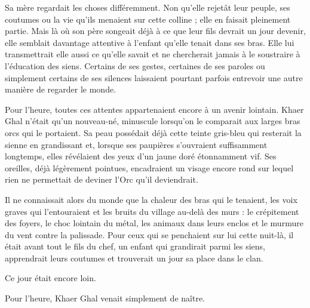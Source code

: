 Sa mère regardait les choses différemment. Non qu'elle rejetât leur peuple, ses
coutumes ou la vie qu'ils menaient sur cette colline ; elle en faisait
pleinement partie. Mais là où son père songeait déjà à ce que leur fils devrait
un jour devenir, elle semblait davantage attentive à l'enfant qu'elle tenait
dans ses bras. Elle lui transmettrait elle aussi ce qu'elle savait et ne
chercherait jamais à le soustraire à l'éducation des siens. Certains de ses
gestes, certaines de ses paroles ou simplement certains de ses silences
laissaient pourtant parfois entrevoir une autre manière de regarder le monde.

Pour l'heure, toutes ces attentes appartenaient encore à un avenir lointain.
Khaer Ghal n'était qu'un nouveau-né, minuscule lorsqu'on le comparait aux
larges bras orcs qui le portaient. Sa peau possédait déjà cette teinte
gris-bleu qui resterait la sienne en grandissant et, lorsque ses paupières
s'ouvraient suffisamment longtemps, elles révélaient des yeux d'un jaune doré
étonnamment vif. Ses oreilles, déjà légèrement pointues, encadraient un visage
encore rond sur lequel rien ne permettait de deviner l'Orc qu'il deviendrait.

Il ne connaissait alors du monde que la chaleur des bras qui le tenaient, les
voix graves qui l'entouraient et les bruits du village au-delà des murs : le
crépitement des foyers, le choc lointain du métal, les animaux dans leurs
enclos et le murmure du vent contre la palissade. Pour ceux qui se penchaient
sur lui cette nuit-là, il était avant tout le fils du chef, un enfant qui
grandirait parmi les siens, apprendrait leurs coutumes et trouverait un jour sa
place dans le clan.

Ce jour était encore loin.

Pour l'heure, Khaer Ghal venait simplement de naître.